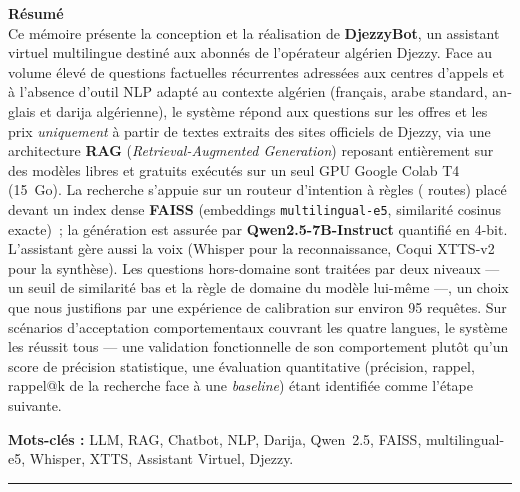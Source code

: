 \documentclass[12pt, a4paper]{report}
\begin{document}
\begin{french}
\textbf{Résumé}\\[0.3cm]
Ce mémoire présente la conception et la réalisation de \textbf{DjezzyBot}, un assistant virtuel multilingue destiné aux abonnés de l'opérateur algérien Djezzy. Face au volume élevé de questions factuelles récurrentes adressées aux centres d'appels et à l'absence d'outil NLP adapté au contexte algérien (français, arabe standard, anglais et darija algérienne), le système répond aux questions sur les offres et les prix \emph{uniquement} à partir de textes extraits des sites officiels de Djezzy, via une architecture \textbf{RAG} (\textit{Retrieval-Augmented Generation}) reposant entièrement sur des modèles libres et gratuits exécutés sur un seul GPU Google Colab T4 (15~Go). La recherche s'appuie sur un routeur d'intention à règles (\numRoutes{} routes) placé devant un index dense \textbf{FAISS} (embeddings \texttt{multilingual-e5}, similarité cosinus exacte)~; la génération est assurée par \textbf{Qwen2.5-7B-Instruct} quantifié en 4-bit. L'assistant gère aussi la voix (Whisper pour la reconnaissance, Coqui XTTS-v2 pour la synthèse). Les questions hors-domaine sont traitées par deux niveaux --- un seuil de similarité bas et la règle de domaine du modèle lui-même ---, un choix que nous justifions par une expérience de calibration sur environ 95 requêtes. Sur \numTestsTotal{} scénarios d'acceptation comportementaux couvrant les quatre langues, le système les réussit tous --- une validation fonctionnelle de son comportement plutôt qu'un score de précision statistique, une évaluation quantitative (précision, rappel, rappel@k de la recherche face à une \textit{baseline}) étant identifiée comme l'étape suivante.

\textbf{Mots-clés :} LLM, RAG, Chatbot, NLP, Darija, Qwen~2.5, FAISS, multilingual-e5, Whisper, XTTS, Assistant Virtuel, Djezzy.
\end{french}

\vspace{0.7cm}
\noindent\rule{\textwidth}{0.4pt}
\vspace{0.5cm}
\end{document}
